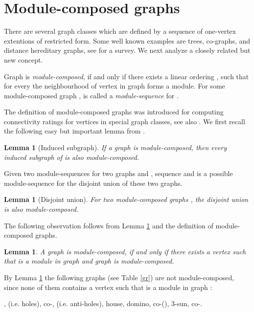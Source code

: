 \documentclass[11pt]{article}
\newtheorem{lemma}[theorem]{Lemma}
\begin{document}
\section{Module-composed graphs}



There are several graph classes which are defined by a sequence of one-vertex
extentions of restricted form. Some well known examples are trees, co-graphs,
and distance hereditary graphs, see \cite{Rao07} for a survey. We next analyze
a closely related but new concept.

Graph  is {\em module-composed}, if and only if there exists a linear 
ordering , such that for every  the 
neighbourhood of vertex  in graph 
 forms a module. 
For some module-composed graph ,  is called a {\em module-sequence} for .

The definition of module-composed graphs
was introduced \cite{AGKKW06} for computing
connectivity ratings for vertices in special graph classes, 
see also \cite{AKKW06}.
We first recall the following easy but important lemma from \cite{AGKKW06}.

\begin{lemma}[Induced subgraph]\label{Li}
If a graph  is module-composed, then every induced subgraph of  is also 
module-composed.
\end{lemma}

Given two module-sequences  for two graphs  and , 
sequence  and  is a possible module-sequence for the disjoint union of these two graphs.

\begin{lemma}[Disjoint union]\label{Ld}
For two module-composed graphs , the disjoint union   is also 
module-composed.
\end{lemma}


The following observation follows from Lemma \ref{Li} and the definition of 
module-composed graphs.

\begin{lemma} \label{Lx}
A graph  is  module-composed, if and only if there exists a
vertex  such that  is a module in graph  and graph  
is module-composed.
\end{lemma}


By Lemma \ref{Lx} the following graphs (see Table \ref{gr}) are  not module-compo\-sed,
since none of them contains a vertex  such that  is a module in graph :

,  (i.e. holes), co-,  (i.e. anti-holes), house,  domino,  
co-(), 3-sun, co-.
\end{document}
